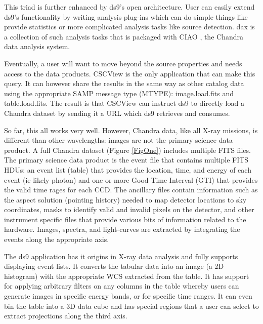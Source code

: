  This triad is further enhanced by ds9's open architecture.  User can easily 
extend ds9's 
functionality by writing analysis plug-ins which can do simple things like provide
statistics or more complicated analysis tasks like source detection.  dax \citep{2011ASPC..442..629G} 
is a collection of such analysis tasks that is packaged with CIAO \citep{2006SPIE.6270E..60F},
the Chandra data analysis system.


Eventually, a user will want to move beyond the source properties and 
needs access to the data products.  CSCView is the only application that
can make this query.  It can however share the results in the 
same way as other catalog data using the
appropriate SAMP message type (MTYPE): image.load.fits and table.load.fits.
The result is that CSCView can instruct ds9 to directly load a Chandra dataset
by sending it a URL which ds9 retrieves and consumes.



So far, this all works very well.  However, Chandra data, like all X-ray 
missions, is different than other wavelengths:  images are not the primary
science data product.
A full Chandra  dataset (Figure \ref{FigOne}) includes multiple FITS files. 
The primary science data product is the event file that contains multiple
FITS HDUs:  an event list (table) that provides the location, time, and
energy of each event (ie likely photon) and one or more Good Time Interval (GTI)
that provides the valid time rages for each CCD.  The ancillary files 
contain information such as the aspect solution (pointing history) needed
to map detector locations to sky coordinates, masks to identify valid and
invalid pixels on the detector, and other instrument specific files that
provide various bits of information related to the hardware.  Images,
spectra, and light-curves are extracted by integrating the events along
the appropriate axis.

The ds9 application has it origins in X-ray data analysis 
and fully supports displaying event lists.  It converts the tabular data into
an image (a 2D histogram) with the appropriate WCS extracted from the table. 
It has support for applying arbitrary filters on any columns in the table
whereby users can generate images in specific energy bands, or for specific 
time ranges.  It can even bin the table into a 3D data cube and has special
regions that a user can select to extract projections along the third axis.

